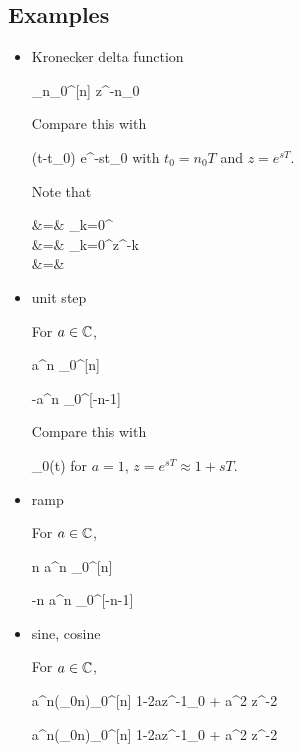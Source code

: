 \subsection{Examples}
\begin{itemize} 

\item Kronecker delta function

\beq
\delta_{n_0}^{[n]}
\maparrow{\calz}
z^{-n_0}
\eeq

Compare this with

\beq
\delta(t-t_0)
\maparrow{\call} e^{-st_0}
\eeq
with $t_0=n_0T$
and $z=e^{sT}$.

Note that

\beqa
\calz[\heavy^{[n]}_0]
&=&
\sum_{k=0}^\infty\calz[\delta^{[n]}_k]
\\
&=&
\sum_{k=0}^\infty z^{-k}
\\
&=&
\eeqa


\item unit step

For $a\in{ \mathbb{C}}$,

\beq
a^n \heavy_0^{[n]}
\maparrow{\calz}
\quad {}
\eeq


\beq
-a^n \heavy_0^{[-n-1]}
\maparrow{\calz}
\quad {}
\eeq

Compare this with

\beq
\heavy_0(t)
\maparrow{\call}
\quad {}
\eeq
for $a=1$, $z=e^{sT}\approx 1 + sT$.


\item ramp

For $a\in{ \mathbb{C}}$,

\beq
n a^n \heavy_0^{[n]}
\maparrow{\calz}
\quad {}
\eeq


\beq
-n a^n \heavy_0^{[-n-1]}
\maparrow{\calz}
\quad {}
\eeq

\item sine, cosine

For $a\in{ \mathbb{C}}$,

\beq
a^n\sin(\omega_0n)\heavy_0^{[n]}
\maparrow{\calz}
{1-2az^{-1}\cos\omega_0 + a^2 z^{-2}}
\eeq

\beq
a^n\cos(\omega_0n)\heavy_0^{[n]}
\maparrow{\calz}
{1-2az^{-1}\cos\omega_0 + a^2 z^{-2}}
\eeq
\end{itemize}


